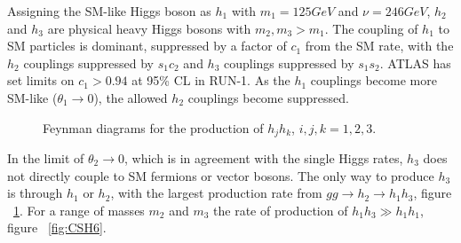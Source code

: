 Assigning the SM-like Higgs boson as ${h_{1}}$ with ${m_{1} = 125 GeV}$  and ${\nu = 246 GeV}$,  ${h_{2}}$ and ${h_{3}}$ are physical heavy Higgs bosons with ${m_{2}, m_{3} > m_{1}}$. The coupling of ${h_{1}}$ to SM particles is dominant, suppressed by a factor of ${c_{1}}$ from the SM rate, with the ${h_{2}}$ couplings suppressed by ${s_{1}c_{2}}$ and ${h_{3}}$ couplings suppressed by ${s_{1}s_{2}}$. ATLAS has set limits on ${c_{1} > 0.94}$ at 95\% CL in RUN-1. As the ${h_{1}}$ couplings become more SM-like (${\theta_{1}\rightarrow{0}}$), the allowed ${h_{2}}$ couplings become suppressed.\newline

\begin{figure}[h]
\begin{center}
\hspace{1cm}
\caption{Feynman diagrams for the production of ${h_{j}h_{k}}$, ${i, j, k = 1, 2, 3}$.}
\label{fig:FeyComp}
\end{center}
\end{figure}


\indent In the limit of ${\theta_{2}\rightarrow{0}}$, which is in agreement with the single Higgs rates, ${h_{3}}$ does not directly couple to SM fermions or vector bosons. The only way to produce ${h_{3}}$ is through ${h_{1}}$ or ${h_{2}}$, with the largest production rate from ${gg\rightarrow h_{2}\rightarrow h_{1}h_{3}}$, figure ~\ref{fig:FeyComp}. For a range of masses ${m_{2}}$ and ${m_{3}}$ the rate of production of ${h_{1}h_{3} \gg h_{1}h_{1}}$, figure ~\ref{fig:CSH6}. \newline

